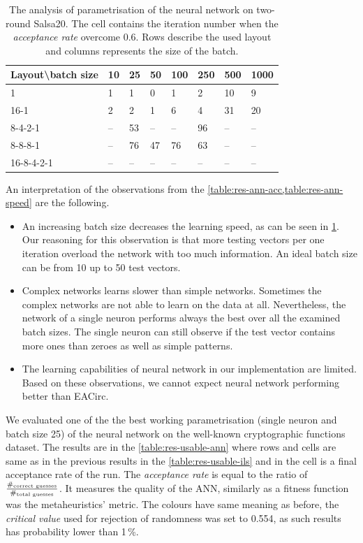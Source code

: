 \documentclass[
  print, %
  Table,   %
  nolof,     %
  nolot,     %
  11pt, %
  oneside  %
]{fithesis3}
\begin{document}
\begin{table}[t]
\centering
\begin{tabular}{l|l l l l l l l}
Layout\textbackslash{}batch size & 10 & 25 & 50 & 100 & 250 & 500 & 1000\\ \hline
1          & 1 & 1 & 0 & 1 & 2 & 10 & 9 \\
16-1       & 2 & 2 & 1 & 6 & 4 & 31 & 20 \\
8-4-2-1    & -- & 53 & -- & -- & 96 & -- & -- \\ 
8-8-8-1    & -- & 76 & 47 & 76 & 63 & -- & -- \\
16-8-4-2-1 & -- & -- & -- & -- & -- & -- & --  

\end{tabular}
\caption{The analysis of parametrisation of the neural network on two-round Salsa20. The cell contains the iteration number when the \textit{acceptance rate} overcome 0.6. Rows describe the used layout and columns represents the size of the batch.}
\label{table:res-ann-speed}
\end{table}

An interpretation of the observations from the \cref{table:res-ann-acc,table:res-ann-speed} are the following.

\begin{itemize}
    \item An increasing batch size decreases the learning speed, as can be seen in \cref{table:res-ann-speed}. Our reasoning for this observation is that more testing vectors per one iteration overload the network with too much information. An ideal batch size can be from 10 up to 50 test vectors.
    \item Complex networks learns slower than simple networks. Sometimes the complex networks are not able to learn on the data at all. Nevertheless, the network of a single neuron performs always the best over all the examined batch sizes. The single neuron can still observe if the test vector contains more ones than zeroes as well as simple patterns.
    \item The learning capabilities of neural network in our implementation are limited. Based on these observations, we cannot expect neural network performing better than EACirc.
\end{itemize}

We evaluated one of the the best working parametrisation (single neuron and batch size 25) of the neural network on the well-known cryptographic functions dataset. The results are in the \cref{table:res-usable-ann} where rows and cells are same as in the previous results in the \cref{table:res-usable-ils} and in the cell is a final acceptance rate of the run. The \textit{acceptance rate} is equal to the ratio of $\frac{\#_{\textnormal{correct guesses}}}{\#_{\textnormal{total guesses}}}$. It measures the quality of the ANN, similarly as a fitness function was the metaheuristics' metric. The colours have same meaning as before, the \textit{critical value} used for rejection of randomness was set to 0.554, as such results has probability lower than 1\,\%.
\end{document}
